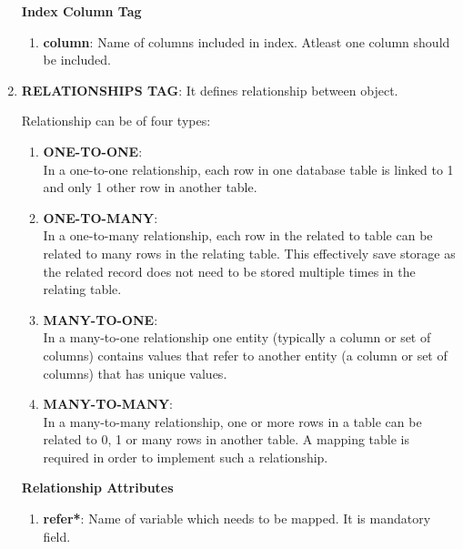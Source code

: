 \begin{enumerate}
		\par
		\textbf{Index Column Tag}

		\begin{enumerate}

			\item \small \textbf{column}: Name of columns included in index. Atleast one column should be included.

		\end{enumerate}
		

	
	\item \small \textbf{RELATIONSHIPS TAG}: It defines relationship between object.

		\par
		Relationship can be of four types:

		\begin{enumerate}

			\item \small \textbf{ONE-TO-ONE}: \textit{\[<one-to-one>\]} In a one-to-one relationship, each row in one database table is linked to 1 and only 1 other row in another table.

			\item \small \textbf{ONE-TO-MANY}: \textit{\[<one-to-many>\]} In a one-to-many relationship, each row in the related to table can be related to many rows in the relating table. This effectively save storage as the related record does not need to be stored multiple times in the relating table.

			\item \small \textbf{MANY-TO-ONE}: \textit{\[<many-to-one>\]} In a many-to-one relationship one entity (typically a column or set of columns) contains values that refer to another entity (a column or set of columns) that has unique values.
	
			\item \small \textbf{MANY-TO-MANY}: \textit{\[<many-to-many>\]} In a many-to-many relationship, one or more rows in a table can be related to 0, 1 or many rows in another table. A mapping table is required in order to implement such a relationship.
	
		\end{enumerate}

			
		\textbf{Relationship Attributes}

		\begin{enumerate}

			\item \small \textbf{refer*}: Name of variable which needs to be mapped. It is mandatory field.


\end{enumerate}
\end{enumerate}
